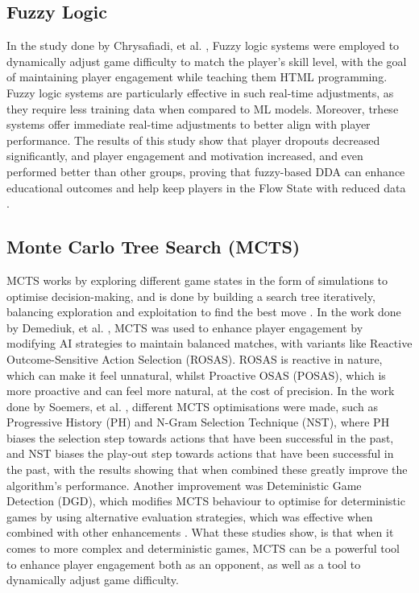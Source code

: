 \begin{spacing}{2.0}
	\subsection{Fuzzy Logic}

	In the study done by Chrysafiadi, et al. \cite{chrysafiadi_fuzzy_based_2023}, Fuzzy logic systems were employed to dynamically adjust game difficulty to match the player's skill level, with the goal of maintaining player engagement while teaching them HTML programming.
	Fuzzy logic systems are particularly effective in such real-time adjustments, as they require less training data when compared to ML models. Moreover, trhese systems offer immediate real-time adjustments to better align with player performance.
	The results of this study show that player dropouts decreased significantly, and player engagement and motivation increased, and even performed better than other groups, proving that fuzzy-based DDA can enhance
	educational outcomes and help keep players in the Flow State with reduced data \cite{chrysafiadi_fuzzy_based_2023}.

	\subsection{Monte Carlo Tree Search (MCTS)}

	MCTS works by exploring different game states in the form of simulations to optimise decision-making, and is done by building a search tree iteratively, balancing exploration and exploitation to find the best
	move \cite{vodopivec_monte_2017} \cite{demediuk_monte_2017}. In the work done by Demediuk, et al. \cite{demediuk_monte_2017}, MCTS was used to enhance player engagement by modifying AI strategies to maintain balanced matches, with variants like Reactive Outcome-Sensitive Action Selection (ROSAS).
	ROSAS is reactive in nature, which can make it feel unnatural, whilst Proactive OSAS (POSAS), which is more proactive and can feel more natural, at the cost of precision. In the work done by Soemers, et al. \cite{soemers_enhancements_2016},
	different MCTS optimisations were made, such as Progressive History (PH) and N-Gram Selection Technique (NST), where PH biases the selection step towards actions that have been successful in the past, and NST
	biases the play-out step towards actions that have been successful in the past, with the results showing that when combined these greatly improve the algorithm's performance. Another improvement was Deteministic
	Game Detection (DGD), which modifies MCTS behaviour to optimise for deterministic games by using alternative evaluation strategies, which was effective when combined with other enhancements \cite{soemers_enhancements_2016}.
	What these studies show, is that when it comes to more complex and deterministic games, MCTS can be a powerful tool to enhance player engagement both as an opponent, as well as a tool to dynamically adjust
	game difficulty.


\end{spacing}
